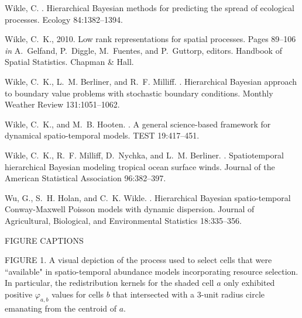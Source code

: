 \documentclass[12pt,english]{article}
\begin{document}
\begin{spacing}{1.9}
\begin{thebibliography}{59}
Wikle, C.
.
\newblock Hierarchical {B}ayesian methods for predicting the spread of
  ecological processes.
\newblock Ecology { 84}:1382--1394.

Wikle, C.~K., 2010.
\newblock Low rank representations for spatial processes.
\newblock Pages 89--106 {\em in\/} A.~Gelfand, P.~Diggle, M.~Fuentes, and
  P.~Guttorp, editors. Handbook of Spatial Statistics. Chapman \& Hall.

Wikle, C.~K., L.~M. Berliner, and R.~F. Milliff.
.
\newblock Hierarchical {B}ayesian approach to boundary value problems with
  stochastic boundary conditions.
\newblock Monthly Weather Review { 131}:1051--1062.

Wikle, C.~K., and M.~B. Hooten.
.
\newblock A general science-based framework for dynamical spatio-temporal
  models.
\newblock TEST { 19}:417--451.

Wikle, C.~K., R.~F. Milliff, D.~Nychka, and L.~M. Berliner.
.
\newblock Spatiotemporal hierarchical {B}ayesian modeling tropical ocean
  surface winds.
\newblock Journal of the American Statistical Association { 96}:382--397.

Wu, G., S.~H. Holan, and C.~K. Wikle.
.
\newblock Hierarchical {B}ayesian spatio-temporal {C}onway-{M}axwell {P}oisson
  models with dynamic dispersion.
\newblock Journal of Agricultural, Biological, and Environmental Statistics
  { 18}:335--356.

\end{thebibliography}



\pagebreak

FIGURE CAPTIONS

FIGURE 1. A visual depiction of the process used to select cells that were ``available" in spatio-temporal abundance models incorporating resource selection.  In particular, the redistribution kernels for the shaded cell $a$ only exhibited positive $\varphi_{a,b}$ values for cells $b$ that intersected with a 3-unit radius circle emanating from the centroid of $a$.


\end{spacing}
\end{document}
